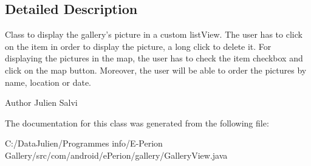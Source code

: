 \subsection{Detailed Description}
Class to display the gallery's picture in a custom list\-View. The user has to click on the item in order to display the picture, a long click to delete it. For displaying the pictures in the map, the user has to check the item checkbox and click on the map button. Moreover, the user will be able to order the pictures by name, location or date. \begin{DoxyAuthor}{Author}
Julien Salvi 
\end{DoxyAuthor}


The documentation for this class was generated from the following file\-:\begin{DoxyCompactItemize}
\item 
C\-:/\-Data\-Julien/\-Programmes info/\-E-\/\-Perion Gallery/src/com/android/e\-Perion/gallery/Gallery\-View.\-java\end{DoxyCompactItemize}
